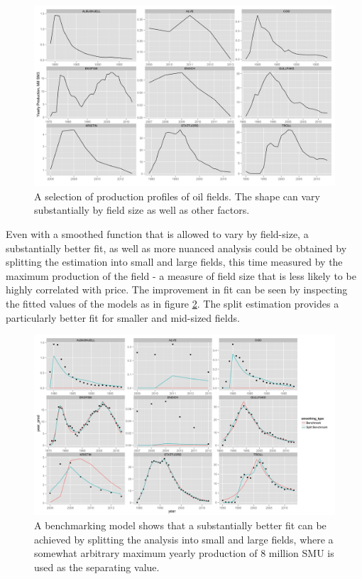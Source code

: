 \documentclass[12pt]{article}
\begin{document}
\begin{figure}
	\includegraphics[width=1\textwidth]{figures/field_inspection_print.png}
	\caption{A selection of production profiles of oil fields.  The shape can vary substantially by field size as well as other factors.}
	\label{field_inspection}
\end{figure}

Even with a smoothed function that is allowed to vary by field-size, a substantially better fit, as well as more nuanced analysis could be obtained by splitting the estimation into small and large fields, this time measured by the maximum production of the field - a measure of field size that is less likely to be highly correlated with price.  The improvement in fit can be seen by inspecting the fitted values of the models as in figure \ref{bench_vs_split}. The split estimation provides a particularly better fit for smaller and mid-sized fields.

\begin{figure}
	\includegraphics[width=1\textwidth]{figures/bench_vs_split_print.png}
	\caption{A benchmarking model shows that a substantially better fit can be achieved by splitting the analysis into small and large fields, where a somewhat arbitrary maximum yearly production of 8 million SMU is used as the separating value.}
	\label{bench_vs_split}
\end{figure}
\end{document}

